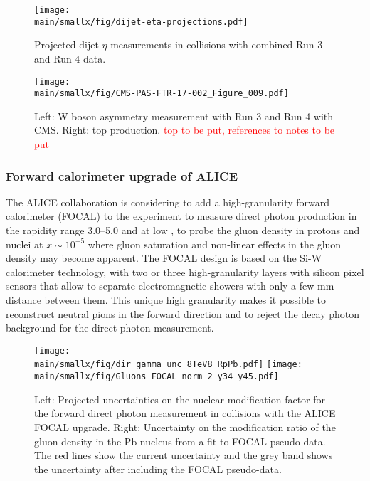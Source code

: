 \documentclass[../report.tex]{subfiles}
\providecommand{\main}{..}
\begin{document}
\begin{figure} %
\centering
\texttt{[image: \\main/smallx/fig/dijet-eta-projections.pdf]}
\caption{
Projected dijet $\eta$ measurements in \pPb collisions with combined Run 3 and Run 4 data.
\label{fig:dijet-eta-projection-cms}
}
\end{figure}

\begin{figure}
    \texttt{[image: \\main/smallx/fig/CMS-PAS-FTR-17-002\_Figure\_009.pdf]}
    \caption{Left: W boson asymmetry measurement with Run 3 and Run 4 with CMS. Right: top production. \textcolor{red}{top to be put, references to notes to be put}
    \label{fig:CMShighpt}
    }
\end{figure}

\clearpage
\newpage

\subsubsection{Forward calorimeter upgrade of ALICE}

The ALICE collaboration is considering to add a high-granularity forward calorimeter (FOCAL) to the experiment to  measure direct photon production in the rapidity range 3.0--5.0 and at low \pT, to probe the gluon density in protons and nuclei at $x\sim 10^{-5}$ where gluon saturation and non-linear effects in the gluon density may become apparent. The FOCAL design is based on the Si-W calorimeter technology, with two or three high-granularity layers with silicon pixel sensors that allow to separate electromagnetic showers with only a few mm distance between them. This unique high granularity makes it possible to reconstruct neutral pions in the forward direction and to reject the decay photon background for the direct photon measurement.

\begin{figure}
\texttt{[image: \\main/smallx/fig/dir\_gamma\_unc\_8TeV8\_RpPb.pdf]}
\texttt{[image: \\main/smallx/fig/Gluons\_FOCAL\_norm\_2\_y34\_y45.pdf]}
\caption{\label{fig:focal}Left: Projected uncertainties on the nuclear modification factor for the forward direct photon measurement in \pPb collisions with the ALICE FOCAL upgrade. Right: Uncertainty on the modification ratio of the gluon density in the Pb nucleus from a fit to FOCAL pseudo-data. The red lines show the current uncertainty and the grey band shows the uncertainty after including the FOCAL pseudo-data.}
\end{figure}
\end{document}
